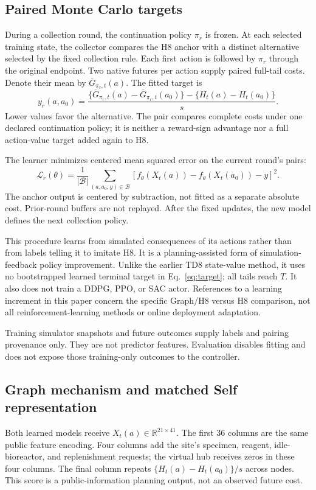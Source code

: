 \documentclass[preprint,12pt]{elsarticle}
\begin{document}
\subsection{Paired Monte Carlo targets}
During a collection round, the continuation policy $\pi_r$ is frozen. At each
selected training state, the collector compares the H8 anchor with a distinct
alternative selected by the fixed collection rule. Each first action is
followed by $\pi_r$ through the original endpoint. Two native futures per action
supply paired full-tail costs. Denote their mean by $\overline G_{\pi_r,t}(a)$.
The fitted target is
\begin{equation}
 y_r(a,a_0)=
 \frac{\{\overline G_{\pi_r,t}(a)-\overline G_{\pi_r,t}(a_0)\}
       -\{H_t(a)-H_t(a_0)\}}{s}.
 \label{eq:target}
\end{equation}
Lower values favor the alternative. The pair compares complete costs under one
declared continuation policy; it is neither a reward-sign advantage nor a full
action-value target added again to H8.

The learner minimizes centered mean squared error on the current round's pairs:
\begin{equation}
 \mathcal L_r(\theta)=
 \frac{1}{|\mathcal B|}\sum_{(a,a_0,y)\in\mathcal B}
 \left[f_\theta(X_t(a))-f_\theta(X_t(a_0))-y\right]^2 .
 \label{eq:loss}
\end{equation}
The anchor output is centered by subtraction, not fitted as a separate absolute
cost. Prior-round buffers are not replayed. After the fixed updates, the new
model defines the next collection policy.

This procedure learns from simulated consequences of its actions rather than
from labels telling it to imitate H8. It is a planning-assisted form of
simulation-feedback policy improvement. Unlike the earlier TD8 state-value
method, it uses no bootstrapped learned terminal target in
Eq.~\eqref{eq:target}; all tails reach $T$. It also does not train a DDPG, PPO,
or SAC actor. References to a learning increment in this paper concern the
specific Graph/H8 versus H8 comparison, not all reinforcement-learning methods
or online deployment adaptation.

Training simulator snapshots and future outcomes supply labels and pairing
provenance only. They are not predictor features. Evaluation disables fitting
and does not expose those training-only outcomes to the controller.

\subsection{Graph mechanism and matched Self representation}
Both learned models receive $X_t(a)\in\mathbb R^{21\times41}$. The first
36 columns are the same public feature encoding. Four columns add the site's
specimen, reagent, idle-bioreactor, and replenishment requests; the virtual hub
receives zeros in these four columns. The final column repeats
$\{H_t(a)-H_t(a_0)\}/s$ across nodes. This score is a public-information planning
output, not an observed future cost.
\end{document}
